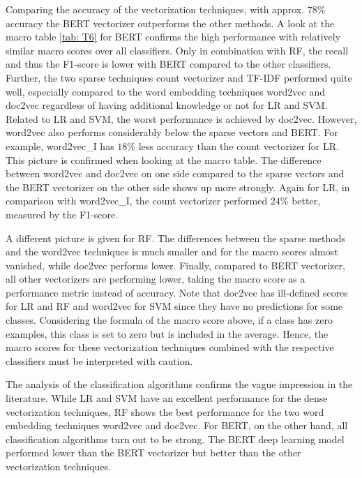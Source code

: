 \documentclass[12pt, a4paper, titlepage]{article}
\begin{document}
Comparing the accuracy of the vectorization techniques, with approx. $78\%$ accuracy the \ac{BERT} vectorizer outperforms the other methods. A look at the macro table \ref{tab: T6} for \ac{BERT} confirms the high performance with relatively similar macro scores over all classifiers. Only in combination with \ac{RF}, the recall and thus the F1-score is lower with \ac{BERT} compared to the other classifiers. Further, the two sparse techniques count vectorizer and \ac{TF-IDF} performed quite well, especially compared to the word embedding techniques word2vec and doc2vec regardless of having additional knowledge or not for \ac{LR} and \ac{SVM}. Related to \ac{LR} and \ac{SVM}, the worst performance is achieved by doc2vec. However, word2vec also performs considerably below the sparse vectors and \ac{BERT}. For example, word2vec\_I has $18\%$ less accuracy than the count vectorizer for \ac{LR}. This picture is confirmed when looking at the macro table. The difference between word2vec and doc2vec on one side compared to the sparse vectors and the \ac{BERT} vectorizer on the other side shows up more strongly. Again for \ac{LR}, in comparison with word2vec\_I, the count vectorizer performed $24\%$ better, measured by the F1-score. 

A different picture is given for \ac{RF}. The differences between the sparse methods and the word2vec techniques is much smaller and for the macro scores almost vanished, while doc2vec performs lower. Finally, compared to \ac{BERT} vectorizer, all other vectorizers are performing lower, taking the macro score as a performance metric instead of accuracy. Note that doc2vec has ill-defined scores for \ac{LR} and \ac{RF} and word2vec for \ac{SVM} since they have no predictions for some classes. Considering the formula of the macro score above, if a class has zero examples, this class is set to zero but is included in the average. Hence, the macro scores for these vectorization techniques combined with the respective classifiers must be interpreted with caution. 

The analysis of the classification algorithms confirms the vague impression in the literature. While \ac{LR} and \ac{SVM} have an excellent performance for the dense vectorization techniques, \ac{RF} shows the best performance for the two word embedding techniques word2vec and doc2vec. For \ac{BERT}, on the other hand, all classification algorithms turn out to be strong. The \ac{BERT} deep learning model performed lower than the \ac{BERT} vectorizer but better than the other vectorization techniques. 
\end{document}
